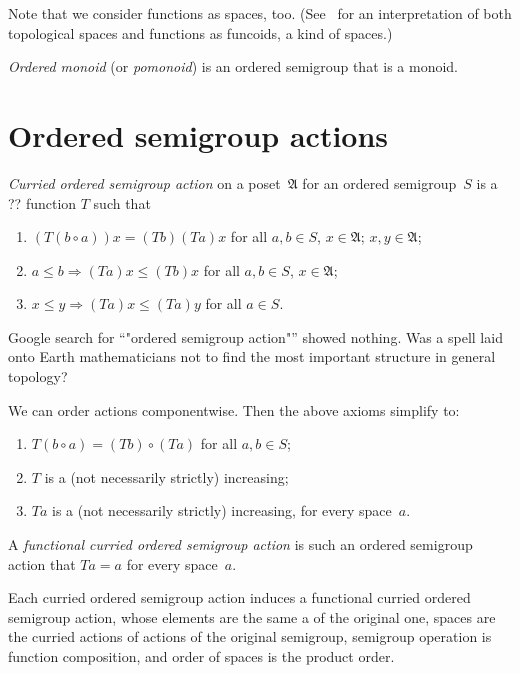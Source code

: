 Note that we consider functions as spaces, too. (See~\cite{volume-1} for an interpretation of both topological spaces and functions as funcoids, a kind of spaces.)

\begin{defn}
\emph{Ordered monoid} (or \emph{pomonoid}) is an ordered semigroup that is a monoid.
\end{defn}

\section{Ordered semigroup actions}

\begin{defn}
\emph{Curried ordered semigroup action} on a poset~$\mathfrak{A}$ for an ordered semigroup~$S$ is a ?? function $T$ such that
\begin{enumerate}
\item $(T(b\circ a))x = (Tb)(Ta)x$ for all $a,b\in S$, $x\in\mathfrak{A}$;
$x,y\in\mathfrak{A}$;
\item $a\leq b\Rightarrow(Ta)x\leq (Tb)x$ for all $a,b\in S$, $x\in\mathfrak{A}$;
\item $x\leq y\Rightarrow(Ta)x\leq (Ta)y$ for all $a\in S$. \end{enumerate}
\end{defn}

\begin{rem}
Google search for ``"ordered semigroup action"'' showed nothing. Was a spell laid onto Earth mathematicians not to find the most important structure in general topology?
\end{rem}

We can order actions componentwise. Then the above axioms simplify to:
\begin{enumerate}
\item $T(b\circ a) = (Tb)\circ(Ta)$ for all $a,b\in S$;
\item $T$ is a (not necessarily strictly) increasing;
\item $Ta$ is a (not necessarily strictly) increasing, for every space~$a$.
\end{enumerate}

\begin{defn}
A \emph{functional curried ordered semigroup action} is such an ordered semigroup action that $Ta=a$ for every space~$a$.
\end{defn}

\begin{thm}
Each curried ordered semigroup action induces a functional curried ordered semigroup action, whose elements are the same a of the original one, spaces are the curried actions of actions of the original semigroup, semigroup operation is function composition, and order of spaces is the product order.
\end{thm}

